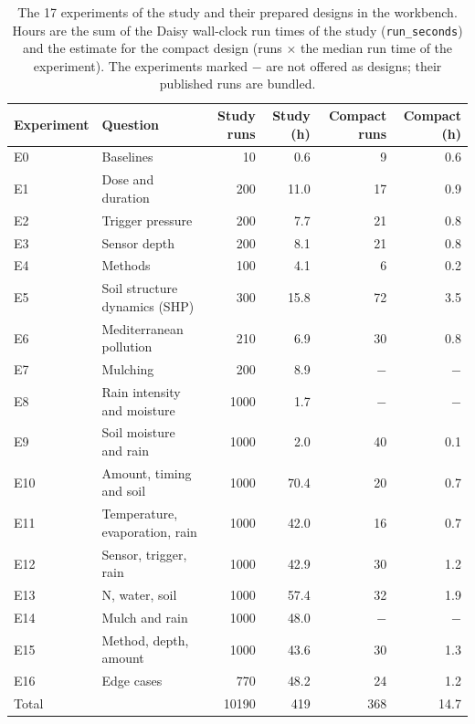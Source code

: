 \begin{table}[H]\centering\small
\caption{The 17 experiments of the study and their prepared designs in the workbench. Hours are the sum of the Daisy wall-clock run times of the study (\texttt{run\_seconds}) and the estimate for the compact design (runs $\times$ the median run time of the experiment). The experiments marked $-$ are not offered as designs; their published runs are bundled.}\label{tab:designs}
\begin{tabular}{llrrrr}\toprule
Experiment & Question & Study runs & Study (h) & Compact runs & Compact (h)\\\midrule
E0 & Baselines & 10 & 0.6 & 9 & 0.6\\
E1 & Dose and duration & 200 & 11.0 & 17 & 0.9\\
E2 & Trigger pressure & 200 & 7.7 & 21 & 0.8\\
E3 & Sensor depth & 200 & 8.1 & 21 & 0.8\\
E4 & Methods & 100 & 4.1 & 6 & 0.2\\
E5 & Soil structure dynamics (SHP) & 300 & 15.8 & 72 & 3.5\\
E6 & Mediterranean pollution & 210 & 6.9 & 30 & 0.8\\
E7 & Mulching & 200 & 8.9 & $-$ & $-$\\
E8 & Rain intensity and moisture & 1000 & 1.7 & $-$ & $-$\\
E9 & Soil moisture and rain & 1000 & 2.0 & 40 & 0.1\\
E10 & Amount, timing and soil & 1000 & 70.4 & 20 & 0.7\\
E11 & Temperature, evaporation, rain & 1000 & 42.0 & 16 & 0.7\\
E12 & Sensor, trigger, rain & 1000 & 42.9 & 30 & 1.2\\
E13 & N, water, soil & 1000 & 57.4 & 32 & 1.9\\
E14 & Mulch and rain & 1000 & 48.0 & $-$ & $-$\\
E15 & Method, depth, amount & 1000 & 43.6 & 30 & 1.3\\
E16 & Edge cases & 770 & 48.2 & 24 & 1.2\\
\midrule Total & & 10190 & 419 & 368 & 14.7\\\bottomrule\end{tabular}\end{table}
